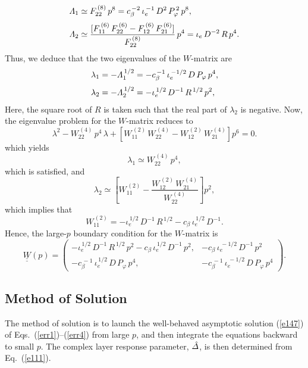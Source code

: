 \documentclass[12pt,prb,aps]{revtex4-1}
\begin{document}
 \begin{align}
 {\mit\Lambda}_1&\simeq F_{22}^{\,(8)}\,p^8=  c_\beta^{\,-2}\,\iota_e^{\,-1}\,D^2\,P_\varphi^{\,2}\,p^8,\\[0.5ex]
 {\mit\Lambda}_2 &\simeq \frac{[F_{11}^{\,(6)}\,F_{22}^{\,(6)} - F_{12}^{\,(6)}\,F_{21}^{\,(6)}]}{F_{22}^{\,(8)}}\,p^4= \iota_e\,D^{-2}\,R\,p^4.
 \end{align}
 Thus, we deduce that the two eigenvalues of the $W$-matrix are 
 \begin{align}
 \lambda_1&=-{\mit\Lambda}_1^{\,1/2}= -c_\beta^{\,-1}\,\iota_e^{\,-1/2}\,D\,P_\varphi\,p^4,\\[0.5ex]
 \lambda_2&=-{\mit\Lambda}_2^{\,1/2}=-\iota_e^{\,1/2}\,D^{-1}\,R^{\,1/2}\,p^2,
 \end{align}
 Here, the square root of $R$ is taken such that the real part of $\lambda_2$ is negative. 
  Now, the eigenvalue problem for the $W$-matrix reduces to 
 \begin{equation}
 \lambda^{2} - W_{22}^{\,(4)}\,p^4\,\lambda + \left[W_{11}^{\,(2)}\,W_{22}^{\,(4)} - W_{12}^{\,(2)}\,W_{21}^{\,(4)}\right]p^6 = 0.
 \end{equation}
which yields
\begin{equation}
\lambda_1\simeq W_{22}^{\,(4)}\,p^4,
\end{equation}
which is satisfied, and
\begin{equation}
\lambda_2 \simeq \left[W_{11}^{\,(2)} - \frac{W_{12}^{\,(2)}\,W_{21}^{\,(4)}}{W_{22}^{\,(4)}}\right]p^2,
\end{equation}
 which implies that
 \begin{equation}
 W_{11}^{\,(2)} = -\iota_e^{\,1/2}\,D^{-1}\,R^{\,1/2}-c_\beta\,\iota_e^{\,1/2}\,D^{-1}.
 \end{equation}
 Hence, the large-$p$ boundary condition for the $W$-matrix
 is
 \begin{equation}\label{e147}
 \underline{\underline{W}}(p) =  \left(\begin{array}{cc} -\iota_e^{\,1/2}\,D^{-1}\,R^{\,1/2}\,p^2-c_\beta\,\iota_e^{\,1/2}\,D^{-1}\,p^2,& - c_\beta\,\iota_e^{\,-1/2}\,D^{-1}\,p^2\\-c_\beta^{\,-1}\,\iota_e^{\,1/2}\,D\,P_\varphi\,p^4,&-c_\beta^{\,-1}\,\iota_e^{\,-1/2}\,D\,P_\varphi\,p^4\end{array}\right).
 \end{equation}

\subsection{Method of Solution}
The method of solution is to launch the well-behaved asymptotic solution (\ref{e147}) of Eqs.~(\ref{err1})--(\ref{err4}) from large $p$, and then
integrate the equations backward to small $p$. The complex layer response parameter, $\hat{\mit\Delta}$, is then determined  from Eq.~(\ref{e111}). 
\end{document}
